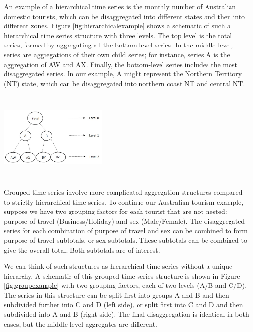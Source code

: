 \documentclass[11pt,a4paper,]{article}
\let\origfigure\figure
\let\endorigfigure\endfigure
\renewenvironment{figure}[1][2] {
    \expandafter\origfigure\expandafter[!htbp]
} {
    \endorigfigure
}
\begin{document}
An example of a hierarchical time series is the monthly number of Australian domestic tourists, which can be disaggregated into different states and then into different zones. Figure \ref{fig:hierarchicalexample} shows a schematic of such a hierarchical time series structure with three levels. The top level is the total series, formed by aggregating all the bottom-level series. In the middle level, series are aggregations of their own child series; for instance, series A is the aggregation of AW and AX. Finally, the bottom-level series includes the most disaggregated series. In our example, A might represent the Northern Territory (NT) state, which can be disaggregated into northern coast NT and central NT.

\begin{figure}

{\centering \includegraphics[width=200px,height=170px,trim=0 0 190 0,clip=true]{Paper-Figures/hierarchical_example} 

}

\caption{An example of a two level hierarchical structure.}\label{fig:hierarchicalexample}
\end{figure}

Grouped time series involve more complicated aggregation structures compared to strictly hierarchical time series. To continue our Australian tourism example, suppose we have two grouping factors for each tourist that are not nested: purpose of travel (Business/Holiday) and sex (Male/Female). The disaggregated series for each combination of purpose of travel and sex can be combined to form purpose of travel subtotals, or sex subtotals. These subtotals can be combined to give the overall total. Both subtotals are of interest.

We can think of such structures as hierarchical time series without a unique hierarchy. A schematic of this grouped time series structure is shown in Figure \ref{fig:groupexample} with two grouping factors, each of two levels (A/B and C/D). The series in this structure can be split first into groups A and B and then subdivided further into C and D (left side), or split first into C and D and then subdivided into A and B (right side). The final disaggregation is identical in both cases, but the middle level aggregates are different.
\end{document}
